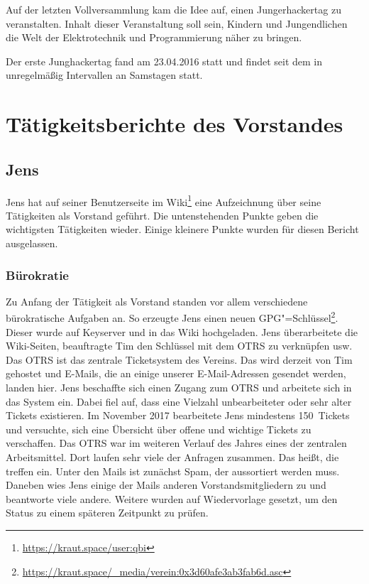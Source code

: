 \documentclass[ngerman]{scrartcl}
\begin{document}
Auf der letzten Vollversammlung kam die Idee auf, einen
Jungerhackertag zu veranstalten. Inhalt dieser Veranstaltung soll
sein, Kindern und Jungendlichen die Welt der Elektrotechnik und
Programmierung näher zu bringen.

Der erste Junghackertag fand am 23.04.2016 statt und findet seit dem in
unregelmäßig Intervallen an Samstagen statt.

\section{Tätigkeitsberichte des Vorstandes}

\subsection{Jens}

Jens hat auf seiner Benutzerseite im
Wiki\footnote{\url{https://kraut.space/user:qbi}} eine Aufzeichnung über seine
Tätigkeiten als Vorstand geführt. Die untenstehenden Punkte geben die
wichtigsten Tätigkeiten wieder. Einige kleinere Punkte wurden für diesen Bericht
ausgelassen.

\subsubsection{Bürokratie}


Zu Anfang der Tätigkeit als Vorstand standen vor allem verschiedene
bürokratische Aufgaben an. So erzeugte Jens einen neuen
GPG"=Schlüssel\footnote{\url{https://kraut.space/_media/verein:0x3d60afe3ab3fab6d.asc}}. Dieser
wurde auf Keyserver und in das Wiki hochgeladen. Jens überarbeitete die
Wiki-Seiten, beauftragte Tim den Schlüssel mit dem OTRS zu verknüpfen usw. Das
OTRS ist das zentrale Ticketsystem des Vereins. Das wird derzeit von Tim
gehostet und E-Mails, die an einige unserer E-Mail-Adressen gesendet werden,
landen hier. Jens beschaffte sich einen Zugang zum OTRS und arbeitete sich in
das System ein. Dabei fiel auf, dass eine Vielzahl unbearbeiteter oder sehr
alter Tickets existieren. Im November 2017 bearbeitete Jens mindestens
150~Tickets und versuchte, sich eine Übersicht über offene und wichtige Tickets
zu verschaffen. Das OTRS war im weiteren Verlauf des Jahres eines der zentralen
Arbeitsmittel. Dort laufen sehr viele der Anfragen zusammen. Das heißt, die
treffen ein. Unter den Mails ist zunächst Spam, der aussortiert werden
muss. Daneben wies Jens einige der Mails anderen Vorstandsmitgliedern zu und
beantworte viele andere. Weitere wurden auf Wiedervorlage gesetzt, um den Status
zu einem späteren Zeitpunkt zu prüfen.
\end{document}
